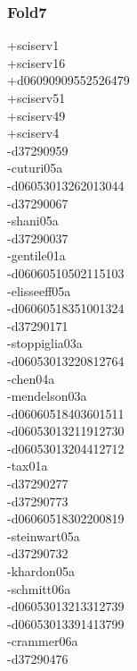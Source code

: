 \begin{multicols}{3}
\subsubsection*{Fold7}
+sciserv1\\
+sciserv16\\
+d06090909552526479\\
+sciserv51\\
+sciserv49\\
+sciserv4\\
-d37290959\\
-cuturi05a\\
-d06053013262013044\\
-d37290067\\
-shani05a\\
-d37290037\\
-gentile01a\\
-d06060510502115103\\
-elisseeff05a\\
-d06060518351001324\\
-d37290171\\
-stoppiglia03a\\
-d06053013220812764\\
-chen04a\\
-mendelson03a\\
-d06060518403601511\\
-d06053013211912730\\
-d06053013204412712\\
-tax01a\\
-d37290277\\
-d37290773\\
-d06060518302200819\\
-steinwart05a\\
-d37290732\\
-khardon05a\\
-schmitt06a\\
-d06053013213312739\\
-d06053013391413799\\
-crammer06a\\
-d37290476\\

\end{multicols}
